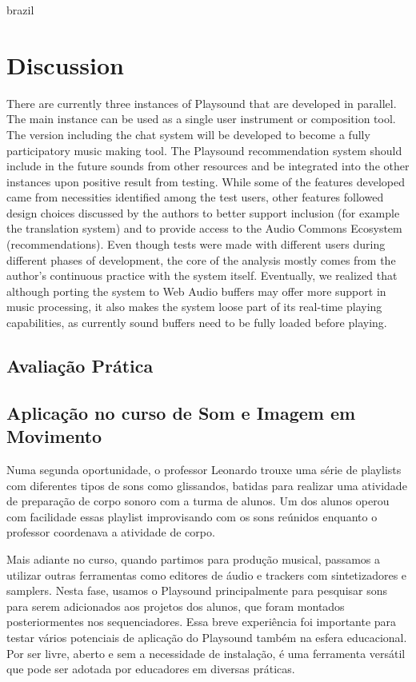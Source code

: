 \begin{otherlanguage*}{brazil}
\section{Discussion}

There are currently three instances of Playsound that are developed in parallel. The main instance can be used as a single user instrument or composition tool. The version including the chat system will be developed to become a fully participatory music making tool. The Playsound recommendation system should include in the future sounds from other resources and be integrated into the other instances upon positive result from testing. While some of the features developed came from necessities identified among the test users, other features followed design choices discussed by the authors to better support inclusion (for example the translation system) and to provide access to the Audio Commons Ecosystem (recommendations). Even though tests were made with different users during different phases of development, the core of the analysis mostly comes from the author's continuous practice with the system itself. Eventually, we realized that although porting the system to Web Audio buffers may offer more support in music processing, it also makes the system loose part of its real-time playing capabilities, as currently sound buffers need to be fully loaded before playing.

\subsection{Avaliação Prática}



\subsection{Aplicação no curso de Som e Imagem em Movimento}


Numa segunda oportunidade, o professor Leonardo trouxe uma série de playlists com diferentes tipos de sons como glissandos, batidas para realizar uma atividade de preparação de corpo sonoro com a turma de alunos. Um dos alunos operou com facilidade essas playlist improvisando com os sons reúnidos enquanto o professor coordenava a atividade de corpo. 

Mais adiante no curso, quando partimos para produção musical, passamos a utilizar outras ferramentas como editores de áudio e trackers com sintetizadores e samplers. Nesta fase, usamos o Playsound principalmente para pesquisar sons para serem adicionados aos projetos dos alunos, que foram montados posteriormentes nos sequenciadores. Essa breve experiência foi importante para testar vários potenciais de aplicação do Playsound também na esfera educacional. Por ser livre, aberto e sem a necessidade de instalação, é uma ferramenta versátil que pode ser adotada por educadores em diversas práticas.


\end{otherlanguage*}
